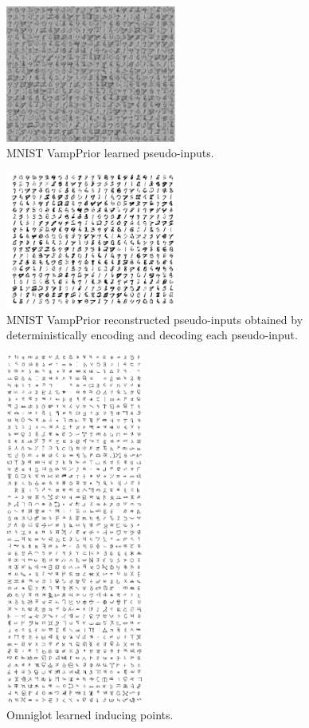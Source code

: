 \begin{figure}[h]
\centering
\includegraphics[width=0.5\textwidth]{img/loracs/mnist/mnist-vamp-inputs.png}
\caption{MNIST VampPrior learned pseudo-inputs.}
\label{fig:mnist-vamp-inducing}
\end{figure}
\begin{figure}[h]
\centering
\includegraphics[width=0.5\textwidth]{img/loracs/mnist/mnist-vamp-outputs.png}
\caption{MNIST VampPrior reconstructed pseudo-inputs obtained by
deterministically encoding and decoding each pseudo-input.}
\label{fig:mnist-vamp-inducing-outputs}
\end{figure}

\begin{figure}[h]
\centering
\includegraphics[width=0.4\textwidth]{img/loracs/omniglot/inducing-points.png}
\caption{Omniglot learned inducing points.}
\label{fig:omniglot-inducing-points}
\end{figure}


